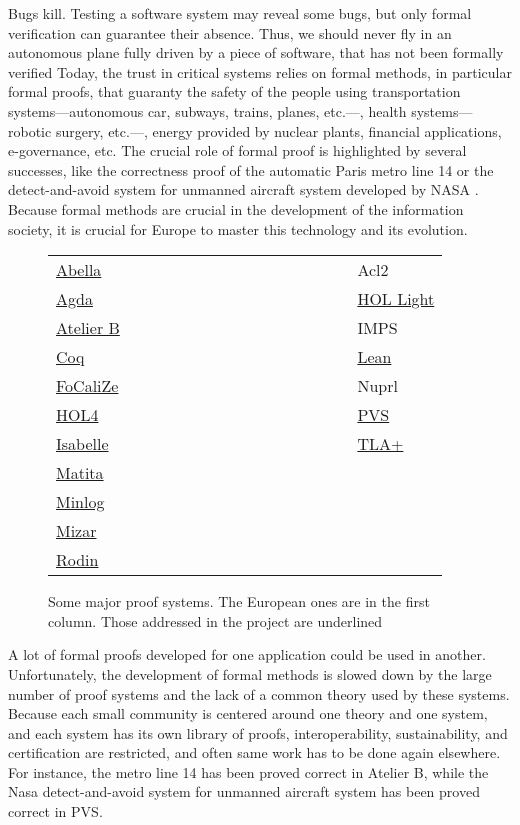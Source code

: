Bugs kill.  Testing a software system may reveal some bugs, but only
formal verification can guarantee their absence.  Thus, we should 
never fly in an
autonomous plane fully driven by a piece of software, that has not been
formally verified  Today, the trust in critical systems relies on
formal methods, in particular formal proofs, that guaranty the safety
of the people using transportation systems---autonomous car, subways,
trains, planes, etc.---, health systems---robotic surgery, etc.---,
energy provided by nuclear plants,
financial applications, e-governance, etc. The crucial role of formal
proof is highlighted by several successes, like the correctness proof
of the automatic Paris metro line 14 \cite{metro14} or the
detect-and-avoid system for unmanned aircraft system developed by NASA
\cite{Munoz16}.  Because formal methods are crucial in the development
of the information society, it is crucial for Europe to master this
technology and its evolution.

\thispagestyle{empty}

\begin{figure}
\begin{tabular}{ll}
  {\sc \underline{Abella}}~~~~~~~~~~~~~~~~~~~~~~~~~~~~~~&{\sc Acl2}\\
{\sc \underline{Agda}} &  {\sc \underline{HOL Light}}\\
{\sc \underline{Atelier B}} &  {\sc IMPS}\\
{\sc \underline{Coq}}  &  {\sc \underline{Lean}}\\
{\sc \underline{FoCaliZe}}  &  {\sc Nuprl}\\
{\sc \underline{HOL4}}  &  {\sc \underline{PVS}}\\
{\sc \underline{Isabelle}}  &  {\sc \underline{TLA+}}\\
{\sc \underline{Matita}}\\
{\sc \underline{Minlog}}\\
{\sc \underline{Mizar}}\\
{\sc \underline{Rodin}}\\
\end{tabular}
\caption{Some major proof systems. The European ones are in the first column.
  Those addressed in the project are underlined\label{systems}}
\end{figure}


A lot of formal proofs developed for one application could be used in
another.  Unfortunately, the development of formal methods is slowed
down by the large number of proof systems and the lack of a common
theory used by these systems.
Because each small community is centered
around one theory and one system, and each system has its own library
of proofs, interoperability, sustainability, and certification are
restricted, and often same work has to be done again elsewhere.  For
instance, the metro line 14 has been proved correct in {\sc Atelier
  B}, while the Nasa detect-and-avoid system for unmanned aircraft
system has been proved correct in {\sc PVS}.

